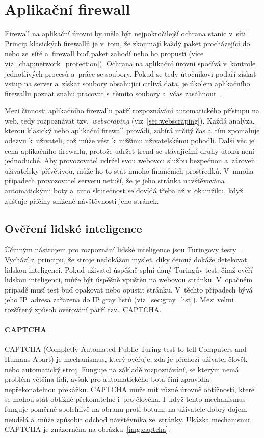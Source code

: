 \chapter{Aplikační firewall}
\label{chap:application_firewall}
Firewall na aplikační úrovni by měla být nejpokročilejší ochrana stanic v~síti. Princip klasických firewallů je v~tom, že zkoumají každý paket procházející do nebo ze~sítě a~firewall buď paket zahodí nebo ho propustí (více viz~\ref{chap:network_protection}). Ochrana na aplikační úrovni spočívá v~kontrole jednotlivých procesů a~práce se soubory. Pokud se tedy útočníkovi podaří získat vstup na server a~získat soubory obsahující citlivá data, je úkolem aplikačního firewallu poznat snahu pracovat s~těmito soubory a~včas zasáhnout~\cite{bib:aplikacni_fw}.

Mezi činnosti aplikačního firewallu patří rozpoznávání automatického přístupu na web, tedy rozpoznávat tzv.~\textit{webscraping} (viz~\ref{sec:webscraping}). Každá analýza, kterou klasický nebo aplikační firewall provádí, zabírá určitý čas a~tím zpomaluje odezvu k~uživateli, což může vést k~nižšímu uživatelskému pohodlí. Další věc je cena aplikačního firewallu, protože udržet trend se stávajícími druhy útoků není jednoduché. Aby provozovatel udržel svou webovou službu bezpečnou a~zároveň uživatelsky přívětivou, může ho to stát mnoho finančních prostředků. V~mnoha případech provozovatel serveru netuší, že je jeho stránka navštěvována automatickými boty a~tuto skutečnost se dovídá třeba až v~okamžiku, když zjišťuje příčiny snížené návštěvnosti jeho stránek.

\section{Ověření lidské inteligence}
Účinným nástrojem pro rozpoznání lidské inteligence jsou Turingovy testy~\cite{bib:intelligence_detect}. Vychází z~principu, že stroje nedokážou myslet, díky čemuž dokáže detekovat lidskou inteligenci. Pokud uživatel úspěšně splní daný Turingův test, čímž ověří lidskou inteligenci, může být úspěšně vpuštěn na webovou stránku. V~opačném případě musí test buď opakovat nebo opustit stránku. V~těchto případech bývá jeho IP~adresa zařazena do IP gray listů (viz~\ref{sec:gray_list}). Mezi velmi rozšířený způsob ověřování patří tzv.~CAPTCHA.

\subsubsection*{CAPTCHA}
\label{sec:captcha}
CAPTCHA (Completly Automated Public Turing test to tell Computers and Humans Apart) je mechanismus, který ověřuje, zda je příchozí uživatel člověk nebo automatický stroj. Funguje na základě rozpoznávání, se kterým nemá problém většina lidí, avšak pro automatického bota činí zpravidla nepřekonatelnou překážku. CAPTCHA může mít různé úrovně obtížnosti, které se mohou stát obtížně překonatelné i~pro člověka. I~když tento mechanismus funguje poměrně spolehlivě na obranu proti botům, na uživatele dobrý dojem neudělá a~může způsobit odchod návštěvníka ze~stránky. Ukázka mechanismu CAPTCHA je znázorněna na obrázku~\ref{img:captcha}.


